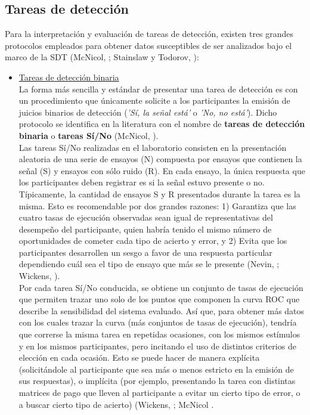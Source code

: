 \subsection{Tareas de detección}

Para la interpretación y evaluación de tareas de detección, existen tres grandes protocolos empleados para obtener datos susceptibles de ser analizados bajo el marco de la SDT (McNicol, \citeyear{McNicol2}; Stainslaw y Todorov, \citeyear{Stainslaw1999}):\\

\begin{itemize}
\item \underline{Tareas de detección binaria}\\

La forma más sencilla y estándar de presentar una tarea de detección es con un procedimiento que únicamente solicite a los participantes la emisión de juicios binarios de detección (\textit{'Sí, la señal está'} o \textit{'No, no está'}). Dicho protocolo se identifica en la literatura con el nombre de \textbf{tareas de detección binaria} o \textbf{tareas Sí/No} (McNicol, \citeyear{McNicol2}).\\

Las tareas Sí/No realizadas en el laboratorio consisten en la presentación aleatoria de una serie de ensayos (N) compuesta por ensayos que contienen la señal (S) y ensayos con sólo ruido (R). En cada ensayo, la única respuesta que los participantes deben registrar es si la señal estuvo presente o no.\\

Típicamente, la cantidad de ensayos S y R presentados durante la tarea es la misma. Esto es recomendable por dos grandes razones: 1) Garantiza que las cuatro tasas de ejecución observadas sean igual de representativas del desempeño del participante, quien habría tenido el mismo número de oportunidades de cometer cada tipo de acierto y error, y 2) Evita que los participantes desarrollen un sesgo a favor de una respuesta particular dependiendo cuál sea el tipo de ensayo que más se le presente (Nevin, \citeyear{Nevin1969}; Wickens, \citeyear{Wickens1}).\\

Por cada tarea Sí/No conducida, se obtiene un conjunto de tasas de ejecución que permiten trazar uno solo de los puntos que componen la curva ROC que describe la sensibilidad del sistema evaluado. Así que, para obtener más datos con los cuales trazar la curva (más conjuntos de tasas de ejecución), tendría que correrse la misma tarea en repetidas ocasiones, con los mismos estímulos y en los mismos participantes, pero incitando el uso de distintos criterios de elección en cada ocasión. Esto se puede hacer de manera explícita (solicitándole al participante que sea más o menos estricto en la emisión de sus respuestas), o implícita (por ejemplo, presentando la tarea con distintas matrices de pago que lleven al participante a evitar un cierto tipo de error, o a buscar cierto tipo de acierto) (Wickens, \citeyear{Wickens1}; McNicol \citeyear{McNicol2}.\\


\end{itemize}
